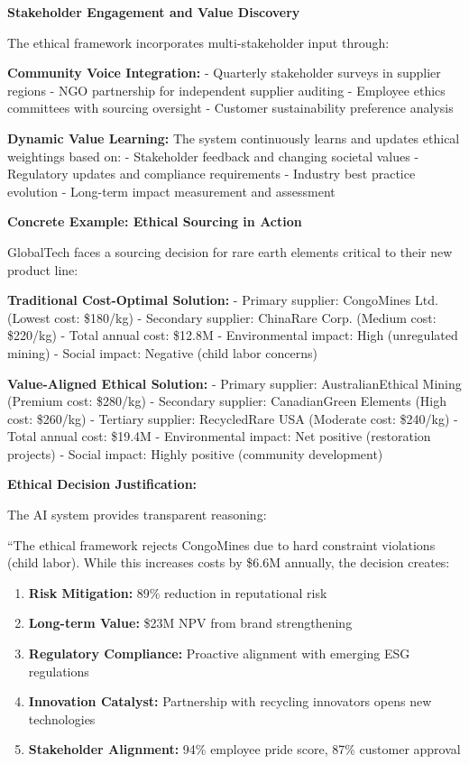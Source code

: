 \documentclass{article}
\begin{document}
\textbf{Stakeholder Engagement and Value Discovery}

The ethical framework incorporates multi-stakeholder input through:

\textbf{Community Voice Integration:}
- Quarterly stakeholder surveys in supplier regions
- NGO partnership for independent supplier auditing
- Employee ethics committees with sourcing oversight
- Customer sustainability preference analysis

\textbf{Dynamic Value Learning:}
The system continuously learns and updates ethical weightings based on:
- Stakeholder feedback and changing societal values
- Regulatory updates and compliance requirements  
- Industry best practice evolution
- Long-term impact measurement and assessment

\textbf{Concrete Example: Ethical Sourcing in Action}

GlobalTech faces a sourcing decision for rare earth elements critical to their new product line:

\textbf{Traditional Cost-Optimal Solution:}
- Primary supplier: CongoMines Ltd. (Lowest cost: \$180/kg)
- Secondary supplier: ChinaRare Corp. (Medium cost: \$220/kg)
- Total annual cost: \$12.8M
- Environmental impact: High (unregulated mining)
- Social impact: Negative (child labor concerns)

\textbf{Value-Aligned Ethical Solution:}
- Primary supplier: AustralianEthical Mining (Premium cost: \$280/kg)
- Secondary supplier: CanadianGreen Elements (High cost: \$260/kg)  
- Tertiary supplier: RecycledRare USA (Moderate cost: \$240/kg)
- Total annual cost: \$19.4M
- Environmental impact: Net positive (restoration projects)
- Social impact: Highly positive (community development)

\textbf{Ethical Decision Justification:}

The AI system provides transparent reasoning:

``The ethical framework rejects CongoMines due to hard constraint violations (child labor). While this increases costs by \$6.6M annually, the decision creates:

\begin{enumerate}
\item \textbf{Risk Mitigation:} 89\% reduction in reputational risk
\item \textbf{Long-term Value:} \$23M NPV from brand strengthening  
\item \textbf{Regulatory Compliance:} Proactive alignment with emerging ESG regulations
\item \textbf{Innovation Catalyst:} Partnership with recycling innovators opens new technologies
\item \textbf{Stakeholder Alignment:} 94\% employee pride score, 87\% customer approval
\end{enumerate}
\end{document}
